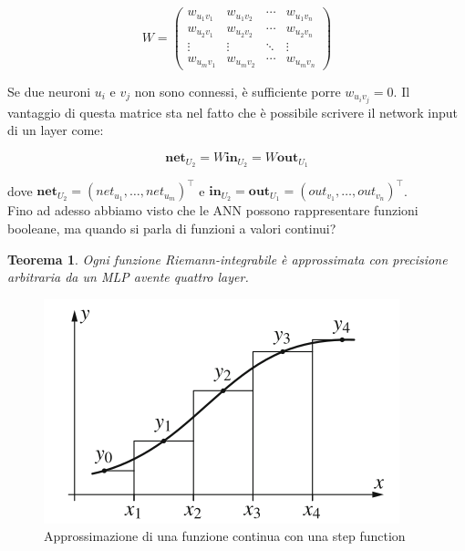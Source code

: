 \documentclass[10pt,a4paper]{article}
\newtheorem{theorem}{Teorema}
\begin{document}
$$
W = \begin{pmatrix}
  w_{u_1v_1} & w_{u_1v_2} & \cdots & w_{u_1v_n} \\
  w_{u_2v_1} & w_{u_2v_2} & \cdots & w_{u_2v_n} \\
  \vdots  & \vdots  & \ddots & \vdots  \\
  w_{u_mv_1} & w_{u_mv_2} & \cdots & w_{u_mv_n} 
 \end{pmatrix}
$$

Se due neuroni $u_i$ e $v_j$ non sono connessi, è sufficiente porre $w_{u_iv_j} = 0$. Il vantaggio di questa matrice sta nel fatto che è possibile scrivere il network input di un layer come:

$$
\mathbf{net}_{U_2} = W \mathbf{in}_{U_2} = W \mathbf{out}_{U_1}
$$

dove $\mathbf{net}_{U_2} = (net_{u_1}, \dots, net_{u_m})^\top$ e $\mathbf{in}_{U_2} = \mathbf{out}_{U_1} = (out_{v_1}, \dots, out_{v_n})^\top$. \\
Fino ad adesso abbiamo visto che le ANN possono rappresentare funzioni booleane, ma quando si parla di funzioni a valori continui? 


\begin{theorem}
Ogni funzione Riemann-integrabile è approssimata con precisione arbitraria da un MLP avente quattro layer.
\end{theorem}

\begin{figure}
\centering
\includegraphics[scale=0.4]{img/approx.png}
\caption{Approssimazione di una funzione continua con una step function}
\label{fig:11}
\end{figure}
\end{document}
